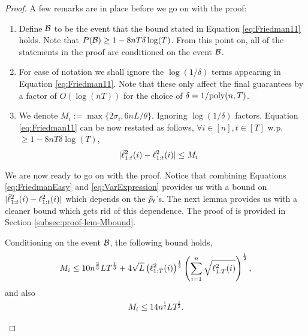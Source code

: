 \begin{proof}
A few remarks are in place before we go on with the proof:
\begin{enumerate}
\item Define $\mathcal{B}$ to be the event that  the bound stated in Equation \eqref{eq:Friedman11} holds. Note that \linebreak
$P(\mathcal{B})  \geq 1- 8nT\delta\log(T)$.
From this point on, all of the statements in the proof  are conditioned on the event $\mathcal{B}$.
\item For ease of notation we shall ignore the $\log(1/\delta)$ terms appearing in Equation \eqref{eq:Friedman11}. Note that these only affect the final guarantees by a factor of $O(\log (nT))$ for the choice of \linebreak $\delta=1/\textup{poly}(n, T)$.
\item We denote $M_i := \max\{ 2\sigma_i,6nL/\theta \}$. Ignoring  $\log(1/\delta)$ factors, Equation \eqref{eq:Friedman11} can be now restated as follows, $\forall i\in[n], t\in[T]$ w.p.$\geq 1- 8nT\delta\log(T)$,
\begin{align}\label{eq:FriedmanEasy}
 | \tilde{\ell}_{1:t}^2(i) - \ell_{1:t}^2(i) |
 &\leq
M_i
 \end{align}
\end{enumerate}

We are now ready to go on with the proof.
Notice that combining Equations \eqref{eq:FriedmanEasy} and \eqref{eq:VarExpression} provides us with a bound on 
$ |\tilde{\ell}_{1:t}^2(i) - \ell_{1:t}^2(i)|$ which depends on the $\tilde{p}_t$'s. The next lemma  provides us with a cleaner bound which gets rid of this dependence. The proof of is provided in Section \ref{subsec:proof-lem-Mbound}.

\begin{lemma}\label{lem:M_bound} 
Conditioning on the event $\mathcal{B}$, the following bound holds,
\begin{align} \label{eq:MboundComplex}
M_i \leq 10n^{\frac{2}{3}}LT^{\frac{1}{3}} + 4\sqrt{L}  \left(\ell_{1:T}^2(i)\right) ^{\frac{1}{4}} \left( \sum_{i=1}^n \sqrt{\ell_{1:T}^2(i)}\right)^{\frac{1}{2}},
\end{align}
and also 
\begin{align} \label{eq:MboundSimple}
M_i \leq 14n^{\frac{1}{2}}LT^{\frac{1}{2}}.
\end{align}
\end{lemma}



\end{proof}
